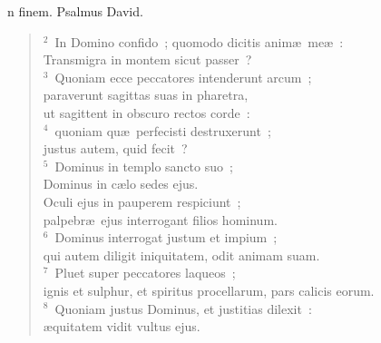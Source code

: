 \bchapter
{}n finem. Psalmus David.
\begin{flushleft}\begin{verse}\vspace{6pt}${}^{2}$~In Domino confido~; quomodo dicitis anim\ae\ me\ae~:\\ Transmigra in montem sicut passer~?\\
${}^{3}$~Quoniam ecce peccatores intenderunt arcum~;\\ paraverunt sagittas suas in pharetra,\\ ut sagittent in obscuro rectos corde~:\\
${}^{4}$~quoniam qu\ae\ perfecisti destruxerunt~;\\ justus autem, quid fecit~?\\
${}^{5}$~Dominus in templo sancto suo~;\\ Dominus in c\ae lo sedes ejus.\\ Oculi ejus in pauperem respiciunt~;\\ palpebr\ae\ ejus interrogant filios hominum.\\
${}^{6}$~Dominus interrogat justum et impium~;\\ qui autem diligit iniquitatem, odit animam suam.\\
${}^{7}$~Pluet super peccatores laqueos~;\\ ignis et sulphur, et spiritus procellarum, pars calicis eorum.\\
${}^{8}$~Quoniam justus Dominus, et justitias dilexit~:\\ \ae quitatem vidit vultus ejus.\end{verse}\end{flushleft}



